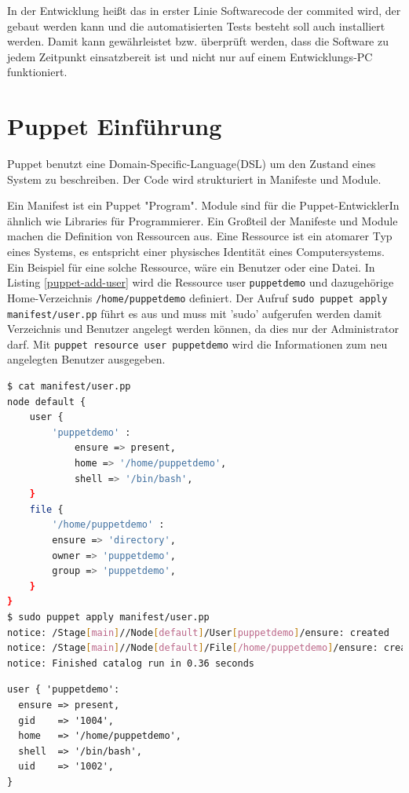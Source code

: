 \documentclass[12pt,a4paper,ngerman]{article}
\begin{document}
In der Entwicklung heißt das in erster Linie Softwarecode der commited wird, der gebaut werden kann und die automatisierten Tests besteht soll auch installiert werden. Damit kann gewährleistet bzw. überprüft werden, dass die Software zu jedem Zeitpunkt einsatzbereit ist und nicht nur auf einem Entwicklungs-PC funktioniert.

\section{Puppet Einführung}

Puppet benutzt eine Domain-Specific-Language(DSL) um den Zustand eines System zu beschreiben. Der Code wird strukturiert in Manifeste und Module.

Ein Manifest ist ein Puppet "Program". Module sind für die Puppet-EntwicklerIn ähnlich wie Libraries für Programmierer. Ein Großteil der Manifeste und Module machen die Definition von Ressourcen aus. Eine Ressource ist ein atomarer Typ eines Systems, es entspricht einer physisches Identität eines Computersystems. Ein Beispiel für eine solche Ressource, wäre ein Benutzer oder eine Datei. In Listing \ref{puppet-add-user} wird die Ressource user \lstinline$puppetdemo$ und dazugehörige Home-Verzeichnis \lstinline$/home/puppetdemo$ definiert. Der Aufruf \lstinline$sudo puppet apply manifest/user.pp$ führt es aus und muss mit 'sudo' aufgerufen werden damit Verzeichnis und Benutzer angelegt werden können, da dies nur der Administrator darf.
Mit \lstinline$puppet resource user puppetdemo$ wird die Informationen zum neu angelegten Benutzer ausgegeben.


\begin{lstlisting}[language=sh,caption=User mit Puppet anlegen, label=puppet-add-user]
$ cat manifest/user.pp 
node default {
    user {
        'puppetdemo' :
            ensure => present,
            home => '/home/puppetdemo',
            shell => '/bin/bash',
    }
    file {
        '/home/puppetdemo' :
        ensure => 'directory',
        owner => 'puppetdemo',
        group => 'puppetdemo',
    }
}
$ sudo puppet apply manifest/user.pp 
notice: /Stage[main]//Node[default]/User[puppetdemo]/ensure: created
notice: /Stage[main]//Node[default]/File[/home/puppetdemo]/ensure: created
notice: Finished catalog run in 0.36 seconds
\end{lstlisting}
\begin{lstlisting}[language=puppet,caption=Anzeige der Benutzerinformation in Puppet, label=puppet-add-user-info]
user { 'puppetdemo':
  ensure => present,
  gid    => '1004',
  home   => '/home/puppetdemo',
  shell  => '/bin/bash',
  uid    => '1002',
}
\end{lstlisting}
\end{document}
